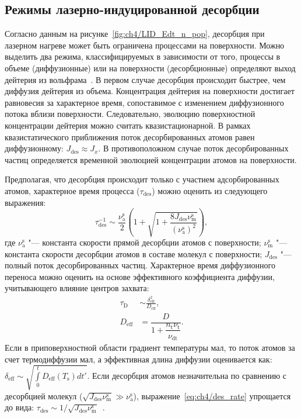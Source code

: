 \subsection{Режимы лазерно-индуцированной десорбции}\label{sec:ch4/sec3/subsec3}

Согласно данным на рисунке~\cref{fig:ch4/LID_Edt_n_pop}, десорбция при лазерном нагреве может быть ограничена процессами на поверхности. Можно выделить два режима, классифицируемых в зависимости от того, процессы в объеме (диффузионные) или на поверхности (десорбционные) определяют выход дейтерия из вольфрама~\cite{Guterl2019}. В первом случае десорбция происходит быстрее, чем диффузия дейтерия из объема. Концентрация дейтерия на поверхности достигает равновесия за характерное время, сопоставимое с изменением диффузионного потока вблизи поверхности. Следовательно, эволюцию поверхностной концентрации дейтерия можно считать квазистационарной. В рамках квазистатического приближения поток десорбированных атомов равен диффузионному: \( J_\mathrm{des}\approx J_{x} \). В противоположном случае поток десорбированных частиц определяется временной эволюцией концентрации атомов на поверхности.

Предполагая, что десорбция происходит только с участием адсорбированных атомов, характерное время процесса (\( \tau_\mathrm{des} \)) можно оценить из следующего выражения:
\begin{equation}
    \label{eq:ch4/des_rate}
    \tau_\mathrm{des}^{-1} \sim \dfrac{\nu_\mathrm{a}^\mathrm{s}}{2} \left( 1 + \sqrt{1+\dfrac{8J_\mathrm{des}\nu_\mathrm{m}^\mathrm{s}}{(\nu_\mathrm{a}^\mathrm{s})^2}} \right),
\end{equation}
где \( \nu_\mathrm{a}^\mathrm{s} \) "--- константа скорости прямой десорбции атомов с поверхности; \( \nu_\mathrm{m}^\mathrm{s} \) "--- константа скорости десорбции атомов в составе молекул с поверхности; \( J_\mathrm{des} \) "--- полный поток десорбированных частиц. Характерное время диффузионного переноса можно оценить на основе эффективного коэффициента диффузии, учитывающего влияние центров захвата:
\begin{subequations}
    \begin{align}
        \tau_\mathrm{D} & \sim \frac{\delta_\mathrm{eff}^2}{D_\mathrm{eff}},                  \\
        D_\mathrm{eff}  & = \dfrac{D}{1+\dfrac{n_\mathrm{t}\nu_\mathrm{t}}{\nu_\mathrm{dt}}}.
    \end{align}
\end{subequations}
Если в приповерхностной области градиент температуры мал, то поток атомов за счет термодиффузии мал, а эффективная длина диффузии оценивается как: \( \delta_\mathrm{eff} \sim \sqrt{\int\limits_0^t D_\mathrm{eff}(T_\mathrm{s})dt'}\). Если десорбция атомов незначительна по сравнению с десорбцией молекул (\(\sqrt{J_\mathrm{des}\nu_\mathrm{m}^{\mathrm{s}}} \gg \nu_\mathrm{a}^\mathrm{s}\)), выражение~\cref{eq:ch4/des_rate} упрощается до вида: \( \tau_\mathrm{des} \sim 1/\sqrt{J_\mathrm{des}\nu_\mathrm{m}^{\mathrm{s}}}\)~\cite{Guterl2019}.

